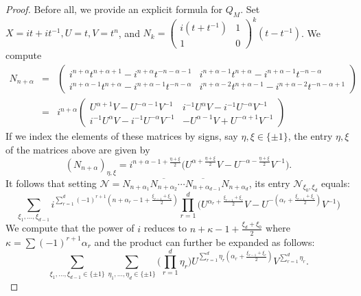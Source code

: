 \documentclass[10pt,a4paper]{amsart}
\newcommand{\calN}{\mathcal{N}}
\begin{document}
\begin{proof}
Before all, we provide an explicit formula for $Q_M$. Set $X=it+it^{-1},U=t,V=t^n$, and $N_k=\begin{pmatrix} i(t+t^{-1}) & 1 \\ 1 & 0 \end{pmatrix}^k(t-t^{-1})$. We compute
\begin{eqnarray*}
N_{n+\alpha}&=&\begin{pmatrix}i^{n+\alpha}t^{n+\alpha+1}-i^{n+\alpha}t^{-n-\alpha-1}& i^{n+\alpha-1}t^{n+\alpha}-i^{n+\alpha-1}t^{-n-\alpha} \\ i^{n+\alpha-1}t^{n+\alpha}-i^{n+\alpha-1}t^{-n-\alpha} & i^{n+\alpha-2}t^{n+\alpha-1} -i^{n+\alpha-2}t^{-n-\alpha+1}\end{pmatrix}\\
&=&i^{n+\alpha}\begin{pmatrix}U^{\alpha+1}V-U^{-\alpha-1}V^{-1}& i^{-1}U^{\alpha}V-i^{-1}U^{-\alpha}V^{-1}\\ i^{-1}U^{\alpha}V-i^{-1}U^{-\alpha}V^{-1}& -U^{\alpha-1}V+U^{-\alpha+1}V^{-1}\end{pmatrix}
\end{eqnarray*}
If we index the elements of these matrices by signs, say $\eta,\xi\in \{\pm 1\}$, the entry $\eta,\xi$ of the matrices above are given by 
$$ \left(N_{n+\alpha}\right)_{\eta,\xi}=i^{n+\alpha-1+\frac{\eta+\xi}{2}}\Big(U^{\alpha+\frac{\eta+\xi}{2}}V-U^{-\alpha-\frac{\eta+\xi}{2}}V^{-1}\Big).$$
It follows that setting $\calN=N_{n+\alpha_1}\overline{N_{n+\alpha_{2}}}\cdots \overline{N_{n+\alpha_{d-1}}}N_{n+\alpha_d}$, its entry $\calN_{\xi_0,\xi_d}$ equals:
$$\sum_{\xi_1,\ldots,\xi_{d-1}} i^{\sum_{r=1}^d (-1)^{r+1}(n+\alpha_r-1+\frac{\xi_{r-1}+\xi_r}{2})}\prod_{r=1}^d\Big(U^{\alpha_r+\frac{\xi_{r-1}+\xi_r}{2}}V-
U^{-(\alpha_r+\frac{\xi_{r-1}+\xi_r}{2})}V^{-1}\Big)$$
We compute that the power of $i$ reduces to $n+\kappa-1+\frac{\xi_d+\xi_0}{2}$ where $\kappa=\sum (-1)^{r+1}\alpha_r$ and the product can further be expanded as follows:
$$\sum_{\xi_1,\ldots,\xi_{d-1}\in\{\pm 1\}}\sum_{\eta_1,\ldots,\eta_d\in\{\pm1\}}\Big(\prod_{r=1}^d\eta_r\Big) U^{\sum_{r=1}^d \eta_r (\alpha_r+\frac{\xi_{r-1}+\xi_r}{2})}V^{\sum_{r=1}^d \eta_r}.$$

\end{proof}
\end{document}
